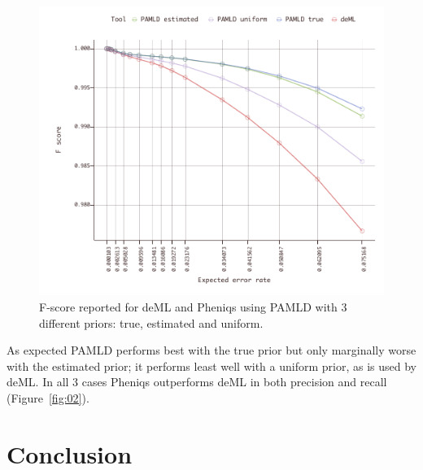 \documentclass[twocolumn]{bmcart}
\begin{document}
\begin{figure}[h!]
\centering
\includegraphics[keepaspectratio,scale=1]{decoder_fscore}
\caption{ F-score reported for deML and Pheniqs using PAMLD with 3 different priors: true, estimated and uniform.}
\label{fig:04}
\end{figure}

As expected PAMLD performs best with the true prior but only marginally worse with the estimated prior; it performs least well with a uniform prior, as is used by deML. In all 3 cases Pheniqs outperforms deML in both precision and recall (Figure~\ref{fig:02}).

\section*{Conclusion}
%
%

\end{document}
